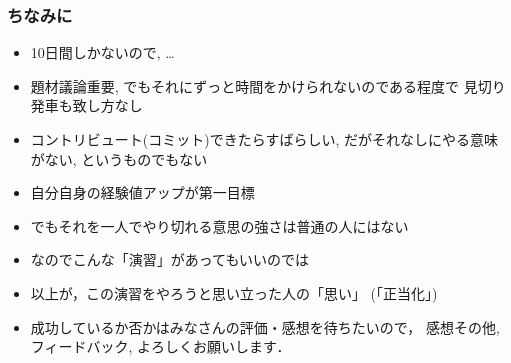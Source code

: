 \documentclass[12pt,dvipdfmx]{beamer}
\begin{document}
\begin{frame}
  \frametitle{ちなみに}
  \begin{itemize}
  \item 10日間しかないので, \ldots
  \item 題材議論重要, でもそれにずっと時間をかけられないのである程度で
    見切り発車も致し方なし
  \item コントリビュート(コミット)できたらすばらしい,
    だがそれなしにやる意味がない, というものでもない
  \item 自分自身の経験値アップが第一目標
  \item でもそれを一人でやり切れる意思の強さは普通の人にはない
  \item なのでこんな「演習」があってもいいのでは
  \end{itemize}
\end{frame}

    
\begin{frame}
  \begin{itemize}
  \item 以上が，この演習をやろうと思い立った人の「思い」
    (「正当化」)
  \item 成功しているか否かはみなさんの評価・感想を待ちたいので，
    感想その他, フィードバック, よろしくお願いします．
  \end{itemize}
\end{frame}
\end{document}

